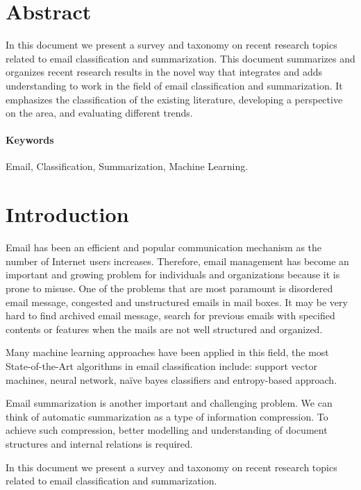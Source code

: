 \documentclass[12pt]{article}
\begin{document}
\maketitle
\newpage
\tableofcontents
\newpage

\section{Abstract}
In this document we present a survey and taxonomy on recent research topics 
related to email classification and summarization. This document summarizes 
and organizes recent research results in the novel way that integrates and 
adds understanding to work in the field of email classification and 
summarization. It emphasizes the classification of the existing literature, 
developing a perspective on the area, and evaluating different trends.

\paragraph{Keywords}
Email, Classification, Summarization, Machine Learning.

\section{Introduction}
Email has been an efficient and popular communication mechanism as the 
number of Internet users increases. Therefore, email management has become 
an important and growing problem for individuals and organizations because 
it is prone to misuse. One of the problems that are most paramount is disordered 
email message, congested and unstructured emails in mail boxes. It may be very 
hard to find archived email message, search for previous emails with specified 
contents or features when the mails are not well structured and organized.

Many machine learning approaches have been applied in this field, the most 
State-of-the-Art algorithms in email classification include: support vector 
machines, neural network, naïve bayes classifiers and entropy-based approach. 

Email summarization is another important and challenging problem. We can think 
of automatic summarization as a type of information compression. To achieve such 
compression, better modelling and understanding of document structures and internal 
relations is required. 

In this document we present a survey and taxonomy on recent research topics 
related to email classification and summarization.
\end{document}
